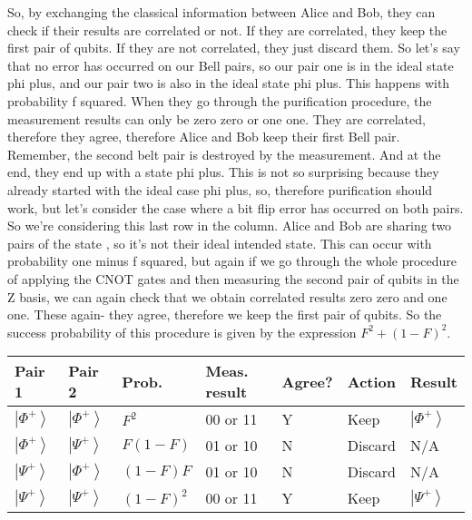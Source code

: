 So, by exchanging the classical information between Alice and Bob, they can check if their results are correlated or not. If they are correlated, they keep the first pair of qubits. If they are not correlated, they just discard them. So let's say that no error has occurred on our Bell pairs, so our pair one is in the ideal state phi plus, and our pair two is also in the ideal state phi plus. This happens with probability f squared. When they go through the purification procedure, the measurement results can only be zero zero or one one. They are correlated, therefore they agree, therefore Alice and Bob keep their first Bell pair. Remember, the second belt pair is destroyed by the measurement. And at the end, they end up with a state phi plus. This is not so surprising because they already started with the ideal case phi plus, so, therefore purification should work, but let's consider the case where a bit flip error has occurred on both pairs. So we're considering this last row in the column. Alice and Bob are sharing two pairs of the state \PsiPlus, so it's not their ideal intended state. This can occur with probability one minus f squared, but again if we go through the whole procedure of applying the CNOT gates and then measuring the second pair of qubits in the Z basis, we can again check that we obtain correlated results zero zero and one one. These again- they agree, therefore we keep the first pair of qubits. So the success probability of this procedure is given by the expression $F^2+(1-F)^2$.

\begin{tabular}{|l|l|l|l|l|l|l|}
\hline Pair 1 & Pair 2 & Prob. & Meas. result & Agree? & Action & Result \\
\hline$\left|\Phi^{+}\right\rangle$ & $\left|\Phi^{+}\right\rangle$ & $F^{2}$ & 00 or 11 & Y & Keep & $\left|\Phi^{+}\right\rangle$ \\
\hline$\left|\Phi^{+}\right\rangle$ & $\left|\Psi^{+}\right\rangle$ & $F(1-F)$ & 01 or 10 & N & Discard & N/A \\
\hline$\left|\Psi^{+}\right\rangle$ & $\left|\Phi^{+}\right\rangle$ & $(1-F) F$ & 01 or 10 & N & Discard & N/A \\
\hline$\left|\Psi^{+}\right\rangle$ & $\left|\Psi^{+}\right\rangle$ & $(1-F)^{2}$ & 00 or 11 & Y & Keep & $\left|\Psi^{+}\right\rangle$ \\
\hline
\end{tabular}

